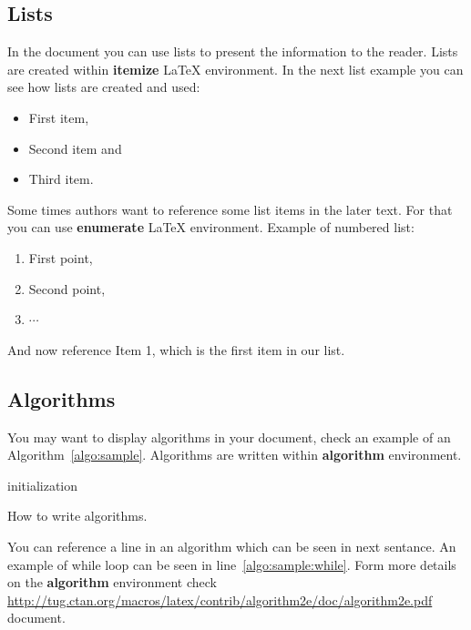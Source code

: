\documentclass[article,english]{stucosrec}
\newcommand{\latex}{\LaTeX\xspace}
\newcommand{\latexe}{\LaTeX$2_\epsilon$\xspace}
\begin{document}
	\subsection{Lists}
	
	In the document you can use lists to present the information to the reader.
	Lists are created within \textbf{itemize} \latex environment.
	In the next list example you can see how lists are created and used:
	
	\begin{itemize}
		\item First item,
		\item Second item and
		\item Third item.
	\end{itemize}
	
	Some times authors want to reference some list items in the later text.
	For that you can use \textbf{enumerate} \latex environment.
	Example of numbered list:
	
	\begin{enumerate}
	    \item First point,
	    \item Second point,
	    \item $\cdots$
	\end{enumerate}
	
	And now reference Item 1, which is the first item in our list.

	\subsection{Algorithms}
	
	You may want to display algorithms in your document, check an example of an Algorithm~\ref{algo:sample}.
	Algorithms are written within \textbf{algorithm} environment.
	
	\begin{algorithm}
		\SetAlgoLined
		\KwResult{how to write algorithm with \latexe}
		initialization\;
		\caption{How to write algorithms.}
		\label{algo:sample}
	\end{algorithm}

	You can reference a line in an algorithm which can be seen in next sentance.
	An example of while loop can be seen in line~\ref{algo:sample:while}.
	Form more details on the \textbf{algorithm} environment check \url{http://tug.ctan.org/macros/latex/contrib/algorithm2e/doc/algorithm2e.pdf} document.
	
\end{document}
